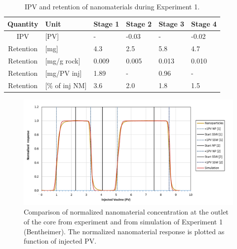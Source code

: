\documentclass[nanomaterials,article,submit,moreauthors,pdftex]{Definitions/mdpi}
\begin{document}
\begin{table}[h!] %
\small
\centering
\caption{IPV and retention of nanomaterials during Experiment 1.}
\label{tab:ipvexp1}
\begin{tabular}{c l l l l l } 
\toprule
\textbf{Quantity} & \textbf{Unit} & \textbf{Stage 1} & \textbf{Stage 2} & \textbf{Stage 3} & \textbf{Stage 4} \\ 
\midrule 
IPV         & [PV]          & -         & -0.03     & -         & -0.02     \\
Retention   & [mg]          & 4.3       & 2.5       & 5.8       & 4.7       \\ 
Retention   & [mg/g rock]   & 0.009     & 0.005     & 0.013     & 0.010     \\ 
Retention   & [mg/PV inj]   & 1.89      & -         & 0.96      & -         \\
Retention   & [\% of inj NM]& 3.6       & 2.0       & 1.8       & 1.5       \\ 
\bottomrule
\end{tabular}
\end{table}

\begin{figure}[h!]
    \centering
    \includegraphics[width=.8\textwidth]{fig/simExpNP.png}
    \caption{Comparison of normalized nanomaterial concentration at the outlet of the core from experiment and from simulation of Experiment 1 (Bentheimer). The normalized nanomaterial response is plotted as function of injected PV.}
    \label{cht:simExpNP}
\end{figure}
\end{document}
